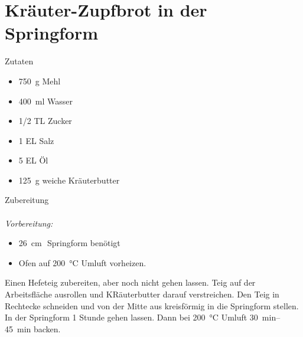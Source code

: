 \section*{Kräuter-Zupfbrot in der Springform}
\ihead{}\ohead{}
\cfoot{}
{\Large Zutaten}
\begin{multicols}{2}
\begin{itemize}
    \item \SI{750}{g} Mehl
    \item \SI{400}{ml} Wasser
    \item \num{1/2} TL Zucker
    \item \num{1} EL Salz
    \item \num{5} EL Öl
    \item \SI{125}{g} weiche Kräuterbutter
\end{itemize}
\end{multicols}
\noindent
{\Large Zubereitung}\\
\\
\textit{Vorbereitung:} 
\begin{itemize}
    \item \SI{26}{cm} \diameter \,\,Springform benötigt
    \item Ofen auf \SI{200}{\celsius} Umluft vorheizen.
\end{itemize}
Einen Hefeteig zubereiten, aber noch nicht gehen lassen.
Teig auf der Arbeitsfläche ausrollen und KRäuterbutter darauf verstreichen.
Den Teig in Rechtecke schneiden und von der Mitte aus kreisförmig in die Springform stellen.
In der Springform \num{1} Stunde gehen lassen.
Dann bei \SI{200}{\celsius} Umluft \SIrange{30}{45}{min} backen.
